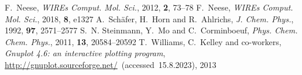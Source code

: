 \documentclass[twoside,twocolumn,9pt]{article}
\begin{document}
\begin{mcitethebibliography}{79}
\mciteBstWouldAddEndPuncttrue
\mciteSetBstMidEndSepPunct{\mcitedefaultmidpunct}
{\mcitedefaultendpunct}{\mcitedefaultseppunct}\relax
\EndOfBibitem
{}
F.~Neese, \emph{WIREs Comput. Mol. Sci.}, 2012, \textbf{2}, 73--78\relax
\mciteBstWouldAddEndPuncttrue
\mciteSetBstMidEndSepPunct{\mcitedefaultmidpunct}
{\mcitedefaultendpunct}{\mcitedefaultseppunct}\relax
\EndOfBibitem
{}
F.~Neese, \emph{WIREs Comput. Mol. Sci.}, 2018, \textbf{8}, e1327\relax
\mciteBstWouldAddEndPuncttrue
\mciteSetBstMidEndSepPunct{\mcitedefaultmidpunct}
{\mcitedefaultendpunct}{\mcitedefaultseppunct}\relax
\EndOfBibitem
{}
A.~Sch{\"a}fer, H.~Horn and R.~Ahlrichs, \emph{J. Chem. Phys.}, 1992,
  \textbf{97}, 2571--2577\relax
\mciteBstWouldAddEndPuncttrue
\mciteSetBstMidEndSepPunct{\mcitedefaultmidpunct}
{\mcitedefaultendpunct}{\mcitedefaultseppunct}\relax
\EndOfBibitem
{}
S.~N. Steinmann, Y.~Mo and C.~Corminboeuf, \emph{Phys. Chem. Chem. Phys.},
  2011, \textbf{13}, 20584--20592\relax
\mciteBstWouldAddEndPuncttrue
\mciteSetBstMidEndSepPunct{\mcitedefaultmidpunct}
{\mcitedefaultendpunct}{\mcitedefaultseppunct}\relax
\EndOfBibitem
{}
T.~Williams, C.~Kelley and {co-workers}, \emph{Gnuplot 4.6: an interactive
  plotting program},
  \url{http://gnuplot.sourceforge.net/}~(accessed~15.8.2023), 2013\relax
\mciteBstWouldAddEndPuncttrue
\mciteSetBstMidEndSepPunct{\mcitedefaultmidpunct}
{\mcitedefaultendpunct}{\mcitedefaultseppunct}\relax
\EndOfBibitem
\end{mcitethebibliography}
\end{document}
